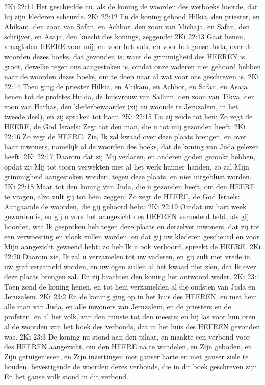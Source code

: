 2Ki 22:11  Het geschiedde nu, als de koning de woorden des wetboeks hoorde, dat hij zijn klederen scheurde.
2Ki 22:12  En de koning gebood Hilkia, den priester, en Ahikam, den zoon van Safan, en Achbor, den zoon van Michaja, en Safan, den schrijver, en Asaja, den knecht des konings, zeggende:
2Ki 22:13  Gaat henen, vraagt den HEERE voor mij, en voor het volk, en voor het ganse Juda, over de woorden dezes boeks, dat gevonden is; want de grimmigheid des HEEREN is groot, dewelke tegen ons aangestoken is, omdat onze vaderen niet gehoord hebben naar de woorden dezes boeks, om te doen naar al wat voor ons geschreven is.
2Ki 22:14  Toen ging de priester Hilkia, en Ahikam, en Achbor, en Safan, en Asaja henen tot de profetes Hulda, de huisvrouw van Sallum, den zoon van Tikva, den zoon van Harhas, den klederbewaarder (zij nu woonde te Jeruzalem, in het tweede deel), en zij spraken tot haar.
2Ki 22:15  En zij zeide tot hen: Zo zegt de HEERE, de God Israels: Zegt tot den man, die u tot mij gezonden heeft:
2Ki 22:16  Zo zegt de HEERE: Zie, Ik zal kwaad over deze plaats brengen, en over haar inwoners, namelijk al de woorden des boeks, dat de koning van Juda gelezen heeft.
2Ki 22:17  Daarom dat zij Mij verlaten, en anderen goden gerookt hebben, opdat zij Mij tot toorn verwekten met al het werk hunner handen, zo zal Mijn grimmigheid aangestoken worden, tegen deze plaats, en niet uitgeblust worden.
2Ki 22:18  Maar tot den koning van Juda, die u gezonden heeft, om den HEERE te vragen, alzo zult gij tot hem zeggen: Zo zegt de HEERE, de God Israels: Aangaande de woorden, die gij gehoord hebt;
2Ki 22:19  Omdat uw hart week geworden is, en gij u voor het aangezicht des HEEREN vernederd hebt, als gij hoordet, wat Ik gesproken heb tegen deze plaats en derzelver inwoners, dat zij tot een verwoesting en vloek zullen worden, en dat gij uw klederen gescheurd en voor Mijn aangezicht geweend hebt; zo heb Ik u ook verhoord, spreekt de HEERE.
2Ki 22:20  Daarom zie, Ik zal u verzamelen tot uw vaderen, en gij zult met vrede in uw graf verzameld worden, en uw ogen zullen al het kwaad niet zien, dat Ik over deze plaats brengen zal. En zij brachten den koning het antwoord weder.
2Ki 23:1  Toen zond de koning henen, en tot hem verzamelden al die oudsten van Juda en Jeruzalem.
2Ki 23:2  En de koning ging op in het huis des HEEREN, en met hem alle man van Juda, en alle inwoners van Jeruzalem, en de priesters en de profeten, en al het volk, van den minste tot den meeste; en hij las voor hun oren al de woorden van het boek des verbonds, dat in het huis des HEEREN gevonden was.
2Ki 23:3  De koning nu stond aan den pilaar, en maakte een verbond voor des HEEREN aangezicht, om den HEERE na te wandelen, en Zijn geboden, en Zijn getuigenissen, en Zijn inzettingen met ganser harte en met ganser ziele te houden, bevestigende de woorden dezes verbonds, die in dit boek geschreven zijn. En het ganse volk stond in dit verbond.

